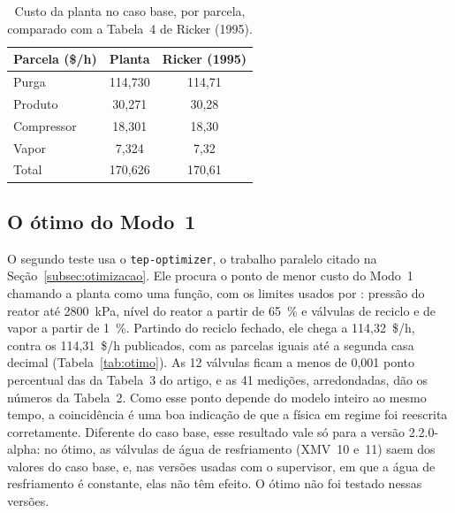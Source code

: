 \begin{table}[htbp]
	\centering
	\caption{Custo da planta no caso base, por parcela, comparado com a Tabela~4 de Ricker (1995).}
	\label{tab:custo_caso_base}
	\footnotesize
	\begin{tabular}{|l|c|c|}
		\hline
		\textbf{Parcela (\$/h)} & \textbf{Planta} & \textbf{Ricker (1995)} \\
		\hline
		Purga & 114,730 & 114,71 \\
		Produto & 30,271 & 30,28 \\
		Compressor & 18,301 & 18,30 \\
		Vapor & 7,324 & 7,32 \\
		\hline
		Total & 170,626 & 170,61 \\
		\hline
	\end{tabular}
\end{table}

\subsection{O ótimo do Modo~1}
\label{subsec:val_otimo}

O segundo teste usa o \texttt{tep-optimizer}, o trabalho paralelo citado na Seção~\ref{subsec:otimizacao}. Ele procura o ponto de menor custo do Modo~1 chamando a planta como uma função, com os limites usados por : pressão do reator até 2800~kPa, nível do reator a partir de 65~\% e válvulas de reciclo e de vapor a partir de 1~\%. Partindo do reciclo fechado, ele chega a 114,32~\$/h, contra os 114,31~\$/h publicados, com as parcelas iguais até a segunda casa decimal (Tabela~\ref{tab:otimo}). As 12 válvulas ficam a menos de 0,001 ponto percentual das da Tabela~3 do artigo, e as 41 medições, arredondadas, dão os números da Tabela~2. Como esse ponto depende do modelo inteiro ao mesmo tempo, a coincidência é uma boa indicação de que a física em regime foi reescrita corretamente. Diferente do caso base, esse resultado vale só para a versão 2.2.0-alpha: no ótimo, as válvulas de água de resfriamento (XMV~10 e~11) saem dos valores do caso base, e, nas versões usadas com o supervisor, em que a água de resfriamento é constante, elas não têm efeito. O ótimo não foi testado nessas versões.

